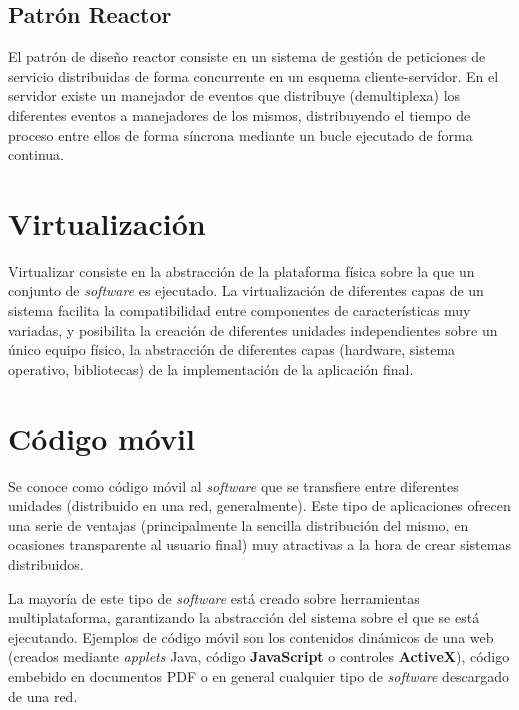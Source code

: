 \subsection{Patrón Reactor}


El patrón de diseño reactor\cite{Coplien95reactor} consiste en un sistema de gestión de peticiones de servicio distribuidas de forma concurrente en un esquema cliente-servidor. En el servidor existe un manejador de eventos que distribuye (demultiplexa) los diferentes eventos a manejadores de los mismos, distribuyendo el tiempo de proceso entre ellos de forma síncrona mediante un bucle ejecutado de forma continua.

\section{Virtualización}

Virtualizar consiste en la abstracción de la plataforma física sobre la que un conjunto de \textit{software} es ejecutado. La virtualización de diferentes capas de un sistema facilita la compatibilidad entre componentes de características muy variadas, y posibilita la creación de diferentes unidades independientes sobre un único equipo físico, la abstracción de diferentes capas (hardware, sistema operativo, bibliotecas) de la implementación de la aplicación final.

\section{Código móvil}

Se conoce como código móvil al \textit{software} que se transfiere entre diferentes unidades (distribuido en una red, generalmente). Este tipo de aplicaciones ofrecen una serie de ventajas (principalmente la sencilla distribución del mismo, en ocasiones transparente al usuario final) muy atractivas a la hora de crear sistemas distribuidos.

La mayoría de este tipo de \textit{software} está creado sobre herramientas multiplataforma, garantizando la abstracción del sistema sobre el que se está ejecutando. Ejemplos de código móvil son los contenidos dinámicos de una web (creados mediante \textit{applets} Java, código \textbf{JavaScript} o controles \textbf{ActiveX}), código embebido en documentos PDF o en general cualquier tipo de \textit{software} descargado de una red.

